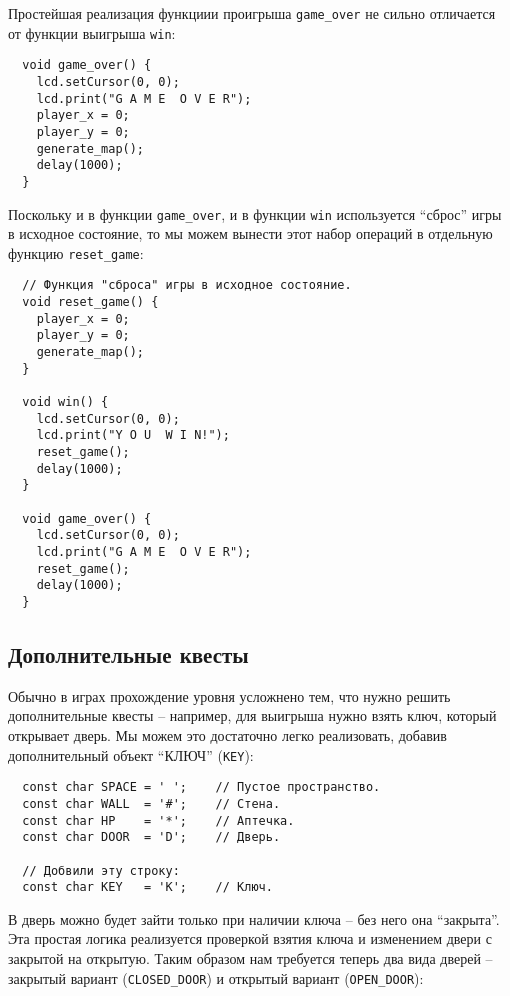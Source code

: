 \documentclass[../sparc.tex]{subfiles}
\begin{document}
Простейшая реализация функциии проигрыша \texttt{game\_over} не сильно
отличается от функции выигрыша \texttt{win}:

\begin{verbatim}
  void game_over() {
    lcd.setCursor(0, 0);
    lcd.print("G A M E  O V E R");
    player_x = 0;
    player_y = 0;
    generate_map();
    delay(1000);
  }
\end{verbatim}

Поскольку и в функции \texttt{game\_over}, и в функции \texttt{win} используется
``сброс'' игры в исходное состояние, то мы можем вынести этот набор операций в
отдельную функцию \texttt{reset\_game}:

\begin{verbatim}
  // Функция "сброса" игры в исходное состояние.
  void reset_game() {
    player_x = 0;
    player_y = 0;
    generate_map();
  }

  void win() {
    lcd.setCursor(0, 0);
    lcd.print("Y O U  W I N!");
    reset_game();
    delay(1000);
  }

  void game_over() {
    lcd.setCursor(0, 0);
    lcd.print("G A M E  O V E R");
    reset_game();
    delay(1000);
  }
\end{verbatim}

\subsection{Дополнительные квесты}

Обычно в играх прохождение уровня усложнено тем, что нужно решить дополнительные
квесты -- например, для выигрыша нужно взять ключ, который открывает дверь.  Мы
можем это достаточно легко реализовать, добавив дополнительный объект ``КЛЮЧ''
(\texttt{KEY}):

\begin{verbatim}
  const char SPACE = ' ';    // Пустое пространство.
  const char WALL  = '#';    // Стена.
  const char HP    = '*';    // Аптечка.
  const char DOOR  = 'D';    // Дверь.

  // Добвили эту строку:
  const char KEY   = 'K';    // Ключ.
\end{verbatim}

В дверь можно будет зайти только при наличии ключа -- без него она ``закрыта''.
Эта простая логика реализуется проверкой взятия ключа и изменением двери с
закрытой на открытую.  Таким образом нам требуется теперь два вида дверей --
закрытый вариант (\texttt{CLOSED\_DOOR}) и открытый вариант
(\texttt{OPEN\_DOOR}):
\end{document}
